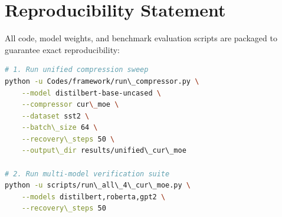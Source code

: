 \section{Reproducibility Statement}
All code, model weights, and benchmark evaluation scripts are packaged to guarantee exact reproducibility:
\begin{lstlisting}[language=bash]
# 1. Run unified compression sweep
python -u Codes/framework/run\_compressor.py \
    --model distilbert-base-uncased \
    --compressor cur\_moe \
    --dataset sst2 \
    --batch\_size 64 \
    --recovery\_steps 50 \
    --output\_dir results/unified\_cur\_moe

# 2. Run multi-model verification suite
python -u scripts/run\_all\_4\_cur\_moe.py \
    --models distilbert,roberta,gpt2 \
    --recovery\_steps 50
\end{lstlisting}
